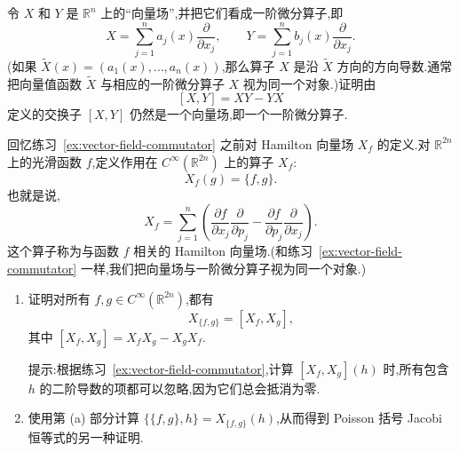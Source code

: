 \begin{exercise}\label{ex:vector-field-commutator}
令 $X$ 和 $Y$ 是 $\mathbb{R}^{n}$ 上的“向量场”,并把它们看成一阶微分算子,即
\[
  X=\sum_{j=1}^{n}a_{j}(x)\frac{\partial}{\partial x_{j}},
  \qquad
  Y=\sum_{j=1}^{n}b_{j}(x)\frac{\partial}{\partial x_{j}}.
\]
(如果 $\widetilde{X}(x)=(a_{1}(x),\ldots,a_{n}(x))$,那么算子 $X$ 是沿 $\widetilde{X}$ 方向的方向导数.通常把向量值函数 $\widetilde{X}$ 与相应的一阶微分算子 $X$ 视为同一个对象.)证明由
\[
  [X,Y]=XY-YX
\]
定义的交换子 $[X,Y]$ 仍然是一个向量场,即一个一阶微分算子.
\end{exercise}

\begin{exercise}\label{ex:hamiltonian-vector-field}
回忆练习~\ref{ex:vector-field-commutator} 之前对 Hamilton 向量场 $X_{f}$ 的定义.对 $\mathbb{R}^{2n}$ 上的光滑函数 $f$,定义作用在 $C^{\infty}(\mathbb{R}^{2n})$ 上的算子 $X_{f}$:
\[
  X_{f}(g)=\{f,g\}.
\]
也就是说,
\[
  X_{f}=\sum_{j=1}^{n}\left(
  \frac{\partial f}{\partial x_{j}}\frac{\partial}{\partial p_{j}}
  -\frac{\partial f}{\partial p_{j}}\frac{\partial}{\partial x_{j}}
  \right).
\]
这个算子称为与函数 $f$ 相关的 Hamilton 向量场.(和练习~\ref{ex:vector-field-commutator} 一样,我们把向量场与一阶微分算子视为同一个对象.)
\begin{enumerate}[label=(\alph*)]
  \item 证明对所有 $f,g\in C^{\infty}(\mathbb{R}^{2n})$,都有
  \[
    X_{\{f,g\}}=[X_{f},X_{g}],
  \]
  其中 $[X_{f},X_{g}]=X_{f}X_{g}-X_{g}X_{f}$.

  提示:根据练习~\ref{ex:vector-field-commutator},计算 $[X_{f},X_{g}](h)$ 时,所有包含 $h$ 的二阶导数的项都可以忽略,因为它们总会抵消为零.
  \item 使用第 (a) 部分计算 $\{\{f,g\},h\}=X_{\{f,g\}}(h)$,从而得到 Poisson 括号 Jacobi 恒等式的另一种证明.
\end{enumerate}
\end{exercise}

